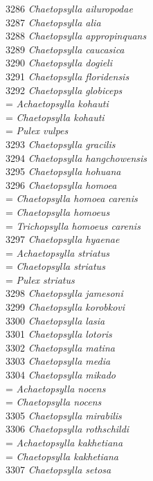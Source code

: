 \documentclass[
]{article}
\begin{document}
3286 \emph{Chaetopsylla ailuropodae}\\
3287 \emph{Chaetopsylla alia}\\
3288 \emph{Chaetopsylla appropinquans}\\
3289 \emph{Chaetopsylla caucasica}\\
3290 \emph{Chaetopsylla dogieli}\\
3291 \emph{Chaetopsylla floridensis}\\
3292 \emph{Chaetopsylla globiceps}\\
= \emph{Achaetopsylla kohauti}\\
= \emph{Chaetopsylla kohauti}\\
= \emph{Pulex vulpes}\\
3293 \emph{Chaetopsylla gracilis}\\
3294 \emph{Chaetopsylla hangchowensis}\\
3295 \emph{Chaetopsylla hohuana}\\
3296 \emph{Chaetopsylla homoea}\\
= \emph{Chaetopsylla homoea carenis}\\
= \emph{Chaetopsylla homoeus}\\
= \emph{Trichopsylla homoeus carenis}\\
3297 \emph{Chaetopsylla hyaenae}\\
= \emph{Achaetopsylla striatus}\\
= \emph{Chaetopsylla striatus}\\
= \emph{Pulex striatus}\\
3298 \emph{Chaetopsylla jamesoni}\\
3299 \emph{Chaetopsylla korobkovi}\\
3300 \emph{Chaetopsylla lasia}\\
3301 \emph{Chaetopsylla lotoris}\\
3302 \emph{Chaetopsylla matina}\\
3303 \emph{Chaetopsylla media}\\
3304 \emph{Chaetopsylla mikado}\\
= \emph{Achaetopsylla nocens}\\
= \emph{Chaetopsylla nocens}\\
3305 \emph{Chaetopsylla mirabilis}\\
3306 \emph{Chaetopsylla rothschildi}\\
= \emph{Achaetopsylla kakhetiana}\\
= \emph{Chaetopsylla kakhetiana}\\
3307 \emph{Chaetopsylla setosa}\\
\end{document}
